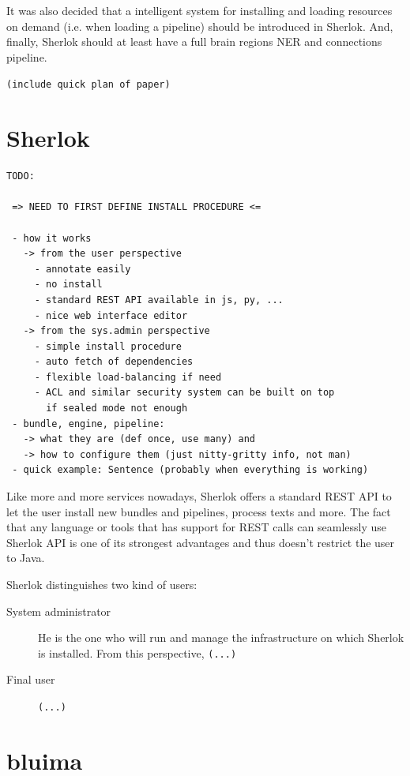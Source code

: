 \documentclass{article}
\newcommand{\TODO}[1]{\texttt{\textcolor{YellowOrange}{(#1)}}} %
\begin{document}
It was also decided that a intelligent system for installing and loading resources on demand (i.e. when loading a pipeline) should be introduced in Sherlok. And, finally, Sherlok should at least have a full brain regions NER and connections pipeline.

\TODO{include quick plan of paper}

\section{Sherlok}

\begin{verbatim}
TODO:

 => NEED TO FIRST DEFINE INSTALL PROCEDURE <=
 
 - how it works
   -> from the user perspective
     - annotate easily
     - no install
     - standard REST API available in js, py, ...
     - nice web interface editor
   -> from the sys.admin perspective
     - simple install procedure
     - auto fetch of dependencies
     - flexible load-balancing if need
     - ACL and similar security system can be built on top
       if sealed mode not enough
 - bundle, engine, pipeline:
   -> what they are (def once, use many) and
   -> how to configure them (just nitty-gritty info, not man)
 - quick example: Sentence (probably when everything is working)
\end{verbatim}

Like more and more services nowadays, Sherlok offers a standard REST API to let the user install new bundles and pipelines, process texts and more. The fact that any language or tools that has support for REST calls can seamlessly use Sherlok API is one of its strongest advantages and thus doesn't restrict the user to Java.

Sherlok distinguishes two kind of users:

\begin{description}

\item[System administrator] He is the one who will run and manage the infrastructure on which Sherlok is installed. From this perspective, \TODO{...}

\item[Final user] \TODO{...}

\end{description}


\section{bluima}
\end{document}
